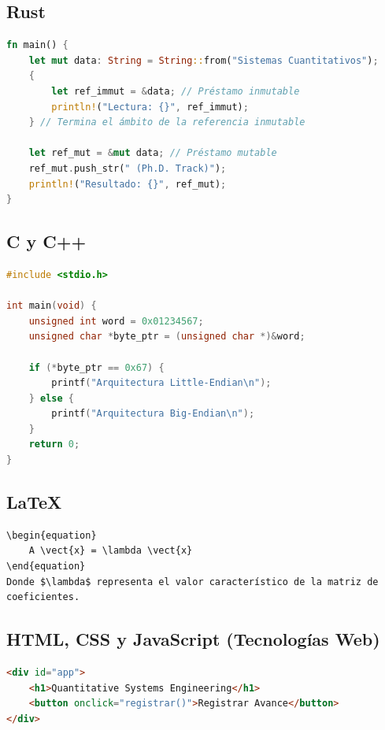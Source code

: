 \documentclass[11pt, a4paper]{article}
\newcommand{\vect}[1]{\mathbf{#1}}
\begin{document}
\subsection{Rust}
\begin{lstlisting}[language=Rust, caption={Verificacion de propiedad y referencias en Rust.}]
fn main() {
    let mut data: String = String::from("Sistemas Cuantitativos");
    {
        let ref_immut = &data; // Préstamo inmutable
        println!("Lectura: {}", ref_immut);
    } // Termina el ámbito de la referencia inmutable
    
    let ref_mut = &mut data; // Préstamo mutable
    ref_mut.push_str(" (Ph.D. Track)");
    println!("Resultado: {}", ref_mut);
}
\end{lstlisting}

\subsection{C y C++}
\begin{lstlisting}[language=C, caption={Deteccion de endianness de la CPU en C.}]
#include <stdio.h>

int main(void) {
    unsigned int word = 0x01234567;
    unsigned char *byte_ptr = (unsigned char *)&word;
    
    if (*byte_ptr == 0x67) {
        printf("Arquitectura Little-Endian\n");
    } else {
        printf("Arquitectura Big-Endian\n");
    }
    return 0;
}
\end{lstlisting}

\subsection{LaTeX}
\begin{lstlisting}[language={[LaTeX]TeX}, caption={Fragmento de codigo matematico estructurado en LaTeX.}]
\begin{equation}
    A \vect{x} = \lambda \vect{x}
\end{equation}
Donde $\lambda$ representa el valor característico de la matriz de coeficientes.
\end{lstlisting}

\subsection{HTML, CSS y JavaScript (Tecnologías Web)}
\begin{lstlisting}[language=HTML, caption={Estructura básica e interactividad en HTML.}]
<div id="app">
    <h1>Quantitative Systems Engineering</h1>
    <button onclick="registrar()">Registrar Avance</button>
</div>
\end{lstlisting}
\end{document}
